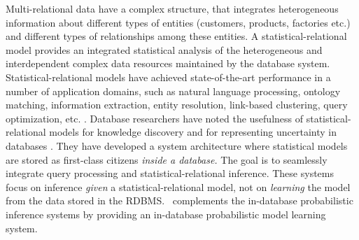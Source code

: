 \documentclass{IEEEtran}
\begin{document}
Multi-relational data have a complex structure, that integrates heterogeneous information about different types of entities (customers, products, factories etc.) and different types of relationships among these entities. 
A statistical-relational model provides an integrated statistical analysis of the heterogeneous and interdependent complex data resources maintained by the database system. 
%
Statistical-relational models have achieved state-of-the-art performance in a number of application domains, such as natural language processing, ontology matching, information extraction, entity resolution, link-based clustering, query optimization, etc. %
\cite{Domingos2009,Niu2011,Getoor2001}.
%
Database researchers have noted the usefulness of statistical-relational models for knowledge discovery and for representing uncertainty in databases 
\cite{Singh2013,Wang2008}. 
%
They have developed a system architecture where statistical models are stored as first-class citizens {\em inside a database.} The goal is to seamlessly integrate query processing and statistical-relational inference. %
%
%
%
These systems focus  on inference {\em given} a statistical-relational model, not on {\em learning} the model from the data stored in the RDBMS. 
\FB\ complements the in-database probabilistic inference systems by providing an in-database probabilistic model learning system. 
\end{document}
